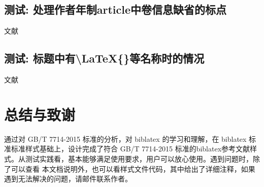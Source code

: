 \subsection{测试: 处理作者年制article中卷信息缺省的标点}\label{sec:article:novol}
\begin{refsection}
文献\cite{刘彻东1998-38-39}\cite{亚洲地质图编目组1978-194-208}
\cite{高光明1998-60-65}

\printbibliography[heading=subbibliography,title=【author-year style:article without volume】]
\end{refsection}

\subsection{测试: 标题中有\textbackslash LaTeX\{\}等名称时的情况}\label{sec:with:latex}
\begin{refsection}
文献\cite{Peebles2001-100-100}\cite{赵凯华1995--}\cite{蒋有绪1998--}

\printbibliography[heading=subbibliography,title=【title with \textbackslash LaTeX\{\}】]
\end{refsection}


\section{总结与致谢}

通过对 GB/T 7714-2015 标准的分析，对 biblatex 的学习和理解，在 biblatex 标准标准样式基础上，设计完成了符合 GB/T 7714-2015 标准的biblatex参考文献样式。从测试实践看，基本能够满足使用要求，用户可以放心使用。遇到问题时，除了可以查看
本文档说明外，也可以看样式文件代码，其中给出了详细注释，如果遇到无法解决的问题，请邮件联系作者。


